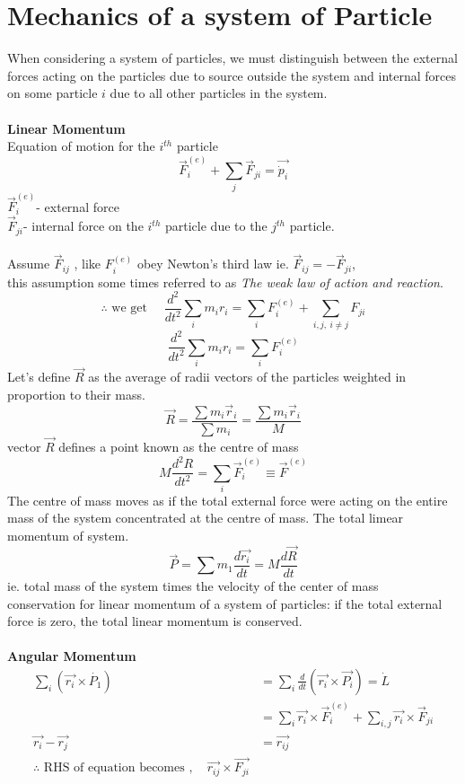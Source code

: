 \section{Mechanics of a system of Particle}
When considering a system of particles, we must distinguish between the external forces acting on the particles due to source outside the system and internal forces on some particle $i$ due to all other particles in the system.\\\\
\textbf{Linear Momentum}\\
Equation of motion for the $i^{th}$ particle
$$\vec{F}_i^{(e)}+\sum\limits_{j}\vec{F}_{ji}=\vec{\dot{p}_i}$$
$\vec{F}_i^{(e)}$- external force\\
$\vec{F}_{ji}$- internal force on the $i^{th}$ particle due to the $j^{th}$ particle.\\\\
Assume $\vec{F}_{ij}$ , like ${F}_i^{(e)}$ obey Newton's third law  ie. $\vec{F}_{ij}= - \vec{F}_{ji}$,\\
this assumption some times referred to as \textit{The weak law of action and reaction}.\\
$$\therefore \text{ we get }\quad \frac{d^2}{dt^2}\sum\limits_{i}m_ir_i=\sum\limits_{i}{F}_i^{(e)}+\sum\limits_{i,j ,\ i\neq j}F_{ji}$$
$$\frac{d^2}{dt^2}\sum\limits_{i}m_ir_i=\sum\limits_{i}{F}_i^{(e)}$$
Let's define $\vec{R}$ as the average of radii vectors of the particles weighted in proportion to their mass.
$$\vec{R}=\frac{\sum m_i \vec{r}_i}{\sum m_i}=\frac{\sum m_i \vec{r}_i}{M}$$
vector $\vec{R}$ defines a point known as the centre of mass
$$M\frac{d^2 R}{dt^2}=\sum\limits_{i}\vec{F}_i^{(e)}\equiv \vec{F}^{(e)}$$
The centre of mass moves as if the total external force were acting on the entire mass of the system concentrated at the centre of mass. The total limear momentum of system.
$$\vec{P}=\sum m_1\frac{d\vec{r_i}}{dt}=M\frac{d\vec{R}}{dt}$$
ie. total mass of the system times the velocity of the center of mass\\
conservation for linear momentum of a system of particles: if the total external force is zero, the total linear momentum is conserved.\\\\
\textbf{Angular Momentum}\\
\begin{align*}
\sum\limits_{i}(\vec{r_i}\times\dot{P_1})&=\sum\limits_{i}\frac{d}{dt}(\vec{r_i}\times\vec{P_i})=\dot{L}\\
&=\sum\limits_{i}\vec{r_i}\times\vec{F}_i^{(e)}+\sum\limits_{i,j}\vec{r_i}\times\vec{F}_{ji}\\
\vec{r_i}-\vec{r_j}&=\vec{r_{ij}}\\
\therefore \text{ RHS of equation becomes },\quad\vec{r_{ij}}\times \vec{F_{ji}}
\end{align*}
